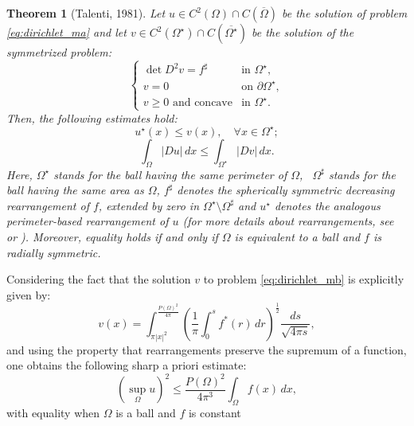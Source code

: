 \documentclass{article}
\newtheorem{theorem}{Theorem}[section]
\numberwithin{equation}{section}
\begin{document}
\begin{theorem}[Talenti, 1981]
    Let $u \in C^2(\Omega) \cap C(\overline{\Omega})$ be the solution of problem \eqref{eq:dirichlet_ma} and let $v \in C^2(\Omega^\star) \cap C(\overline{\Omega^\star})$ be the solution of the symmetrized problem:
    \begin{equation}\label{eq:dirichlet_mb}
    \begin{cases} 
    \det D^2v = f^\sharp & \text{in } \Omega^\star, \\ 
    v = 0 & \text{on } \partial \Omega^\star, \\
    v \geq 0 \text{ and concave} & \text{in } \Omega^\star.
    \end{cases}
    \end{equation}
    Then, the following estimates hold:
    \begin{equation}\label{eq:comparison1}
        u^\star(x) \leq v(x), \quad \forall x \in \Omega^\star;
    \end{equation}
    \begin{equation}\label{eq:comparison2}
        \int_{\Omega} |Du|\,dx \leq \int_{\Omega^\star} |Dv|\,dx.
    \end{equation}
    Here, $\Omega^\star$ stands for the ball having the same perimeter of $\Omega$, \ $\Omega^\sharp$ stands for the ball having the same area as $\Omega$, $f^\sharp$ denotes the spherically symmetric decreasing rearrangement of $f$, extended by zero in $\Omega^\star \setminus \Omega^\sharp$ and $u^\star$ denotes the analogous perimeter-based rearrangement of $u$ (for more details about rearrangements, see \cite{talenti1981} or \cite{tso1989}). Moreover, equality holds if and only if $\Omega$ is equivalent to a ball and $f$ is radially symmetric.
\end{theorem}
\noindent Considering the fact that the solution $v$ to problem \eqref{eq:dirichlet_mb} is explicitly given by:
\begin{equation}
   v(x) = \int_{\pi|x|^2}^{\frac{P(\Omega)^2}{4\pi}} \left( \frac{1}{\pi} \int_0^s f^*(r)\,dr \right)^\frac{1}{2} \frac{ds}{\sqrt{4\pi s}},
\end{equation} 
and using the property that rearrangements preserve the supremum of a function, one obtains the following sharp a priori estimate:
\begin{equation}
    (\sup_\Omega u)^2 \leq \frac{P(\Omega)^2}{4\pi^3}\int_\Omega f(x)\,dx,
\end{equation}
with equality when $\Omega$ is a ball and $f$ is constant
\end{document}
